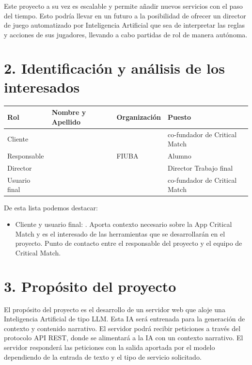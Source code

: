 \documentclass[
11pt, %
]{Clases/charter}
\begin{document}
Este proyecto a su vez es escalable y permite añadir nuevos servicios con el paso del tiempo.
Esto podría llevar en un futuro a la posibilidad de ofrecer un director de juego automatizado por Inteligencia Artificial que sea de interpretar las reglas y acciones de sus jugadores,
llevando a cabo partidas de rol de manera autónoma.


\section{2. Identificación y análisis de los interesados}
\label{sec:interesados}

\begin{table}[ht]
	\begin{tabularx}{\linewidth}{@{}|l|X|X|l|@{}}
		\hline
		\rowcolor[HTML]{C0C0C0}
		Rol           & Nombre y Apellido & Organización    & Puesto                        \\ \hline
		Cliente       & \clientename      & \empclientename & co-fundador de Critical Match \\ \hline
		Responsable   & \authorname       & FIUBA           & Alumno                        \\ \hline
		Director      & \supname          & \pertesupname   & Director Trabajo final        \\ \hline
		Usuario final & \clientename      & \empclientename & co-fundador de Critical Match \\ \hline
	\end{tabularx}
\end{table}

De esta lista podemos destacar:
\begin{itemize}
	\item Cliente y usuario final: \clientename.
	      Aporta contexto necesario sobre la App Critical Match y es el interesado de las herramientas que se desarrollarán en el proyecto.
	      Punto de contacto entre el responsable del proyecto y el equipo de Critical Match.
\end{itemize}

\section{3. Propósito del proyecto}
\label{sec:proposito}
El propósito del proyecto es el desarrollo de un servidor web que aloje una Inteligencia Artificial de tipo LLM.
Esta IA será entrenada para la generación de contexto y contenido narrativo.
El servidor podrá recibir peticiones a través del protocolo API REST,
donde se alimentará a la IA con un contexto narrativo.
El servidor responderá las peticiones con la salida aportada por el modelo
dependiendo de la entrada de texto y el tipo de servicio solicitado.
\end{document}
